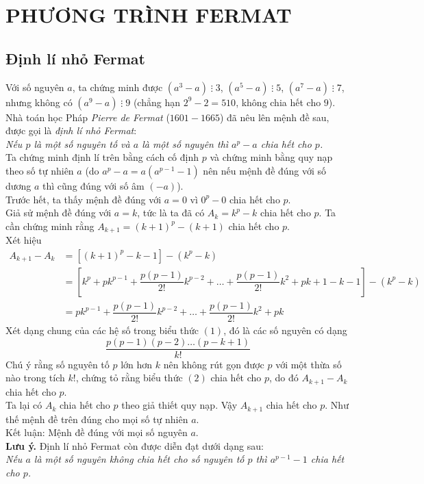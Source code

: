 \section{PHƯƠNG TRÌNH FERMAT}

\subsection{Định lí nhỏ Fermat}
Với số nguyên $a$, ta chứng minh được $(a^3-a)\;\vdots\;3$, $(a^5-a)\;\vdots\;5$, $(a^7-a)\;\vdots\;7$, nhưng không có  $(a^9-a)\;\vdots\;9$ (chẳng hạn $2^9-2=510$, không chia hết cho $9$).\\
Nhà toán học Pháp \textit{Pierre de Fermat} ($1601-1665$) đã nêu lên mệnh đề sau, được gọi là \textit{định lí nhỏ Fermat}:\\
\textit{Nếu $p$ là một số nguyên tố và $a$ là một số nguyên thì $a^p-a$ chia hết cho $p$.}\\
Ta chứng minh định lí trên bằng cách cố định $p$ và chứng minh bằng quy nạp theo số tự nhiên $a$ (do $a^p-a=a(a^{p-1}-1)$ nên nếu mệnh đề đúng với số dương $a$ thì cũng đúng với số âm $(-a)$).\\
Trước hết, ta thấy mệnh đề đúng với $a=0$ vì $0^p-0$ chia hết cho $p$.\\
Giả sử mệnh đề đúng với $a=k$, tức là ta đã có $A_k=k^p-k$ chia hết cho $p$. Ta cần chứng minh rằng $A_{k+1}=(k+1)^p-(k+1)$ chia hết cho $p$.\\
Xét hiệu
\begin{align}
A_{k+1}-A_k &= \left[ (k+1)^p-k-1\right]-(k^p-k)\nonumber\\
&= \left[ k^p+pk^{p-1}+\dfrac{p(p-1)}{2!}k^{p-2}+\dotsc+\dfrac{p(p-1)}{2!}k^2+pk+1-k-1\right]-(k^p-k)\nonumber\\
&= pk^{p-1}+\dfrac{p(p-1)}{2!}k^{p-2}+\dotsc+\dfrac{p(p-1)}{2!}k^2+pk\tag{1}
\end{align}
Xét dạng chung của các hệ số trong biểu thức $(1)$, đó là các số nguyên có dạng
\begin{equation}
\dfrac{p(p-1)(p-2)\dotsc(p-k+1)}{k!}\tag{2}
\end{equation}
Chú ý rằng số nguyên tố $p$ lớn hơn $k$ nên không rút gọn được $p$ với một thừa số nào trong tích $k!$, chứng tỏ rằng biểu thức $(2)$ chia hết cho $p$, do đó $A_{k+1}-A_k$ chia hết cho $p$.\\
Ta lại có $A_k$ chia hết cho $p$ theo giả thiết quy nạp. Vậy $A_{k+1}$ chia hết cho $p$. Như thế mệnh đề trên đúng cho mọi số tự nhiên $a$.\\
Kết luận: Mệnh đề đúng với mọi số nguyên $a$.\\
\textbf{Lưu ý.} Định lí nhỏ Fermat còn được diễn đạt dưới dạng sau:\\
\textit{Nếu $a$ là một số nguyên không chia hết cho số nguyên tố $p$ thì $a^{p-1}-1$ chia hết cho $p$.}
